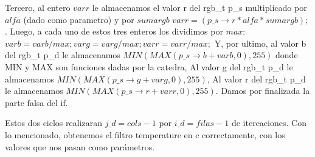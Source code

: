 Tercero, al entero $varr$ le almacenamos el valor r del rgb\_t p\_s multiplicado por $alfa$ (dado como parametro) y por $sumargb$ $varr = (p\_s\rightarrow r * alfa * sumargb);$.\newline
Luego, a cada uno de estos tres enteros los dividimos por $max$: \newline
$varb = varb/max;
varg = varg/max;
varr = varr/max;$\newline
Y, por ultimo, al valor b del rgb\_t p\_d le almacenamos $MIN(MAX(p\_s\rightarrow b + varb, 0),255)$ donde MIN y MAX son funciones dadas por la catedra, \newline
Al valor g del rgb\_t p\_d le almacenamos $MIN(MAX(p\_s\rightarrow g + varg, 0),255)$,\newline
Al valor r del rgb\_t p\_d le almacenamos $MIN(MAX(p\_s\rightarrow r + varr, 0),255)$.\newline
Damos por finalizada la parte falsa del if.\newline

Estos dos ciclos realizaran $j\_d = cols - 1$  por $i\_d = filas -1$ de itereaciones.\newline
Con lo mencionado, obtenemos el filtro temperature en c correctamente, con los valores que nos pasan como parámetros.\newline

\vspace*{0.3cm} \noindent
